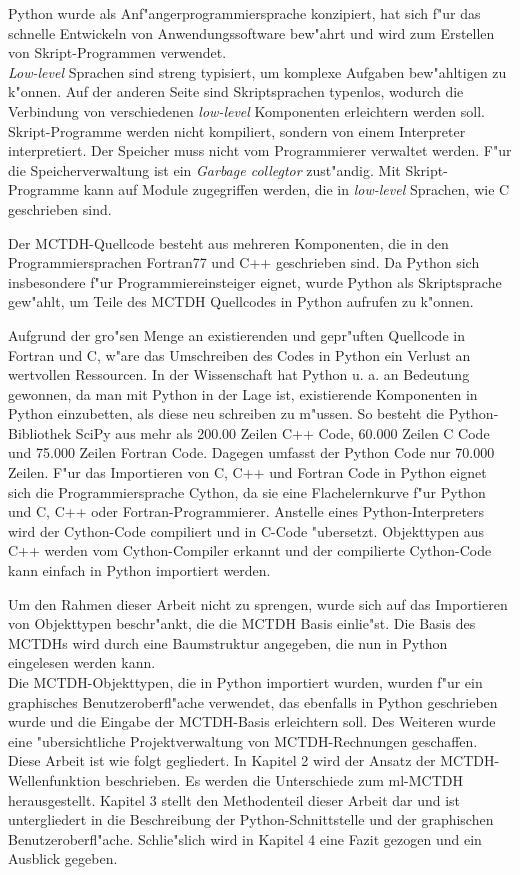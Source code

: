 Python wurde als Anf"angerprogrammiersprache konzipiert, hat sich f"ur das schnelle Entwickeln von Anwendungssoftware bew"ahrt und wird zum 
Erstellen von Skript-Program\-men verwendet. \cite{PyBook} 
\\\textit{Low-level} Sprachen sind streng typisiert, um komplexe Aufgaben bew"ahltigen zu k"onnen. 
Auf der anderen Seite sind Skriptsprachen typenlos, wodurch die Verbindung von verschiedenen \textit{low-level} Komponenten erleichtern werden soll. \cite{PyBook2} 
Skript-Programme werden nicht kompiliert, sondern von einem Interpreter interpretiert. 
Der Speicher muss nicht vom Programmierer verwaltet werden. F"ur die Speicherverwaltung ist ein
\textit{Garbage collegtor} zust"andig.
 Mit Skript-Programme kann auf Module zugegriffen werden, die in \textit{low-level} Sprachen,
 wie C geschrieben sind. \cite{PyKana}     
 
 Der MCTDH-Quellcode besteht aus mehreren Komponenten, die in den Programmiersprachen Fortran77 und C++ geschrieben sind.
 Da Python sich insbesondere f"ur Programmier\-einsteiger eignet, wurde Python als Skriptsprache gew"ahlt, um Teile des MCTDH Quellcodes in Python aufrufen
zu k"onnen.

Aufgrund der gro"sen Menge an existierenden und gepr"uften Quellcode in Fortran und C, w"are das Umschreiben des Codes in Python
ein Verlust an wertvollen Ressourcen. In der Wissenschaft hat Python u. a. an Bedeutung gewonnen, da man 
mit Python in der Lage ist, existierende Komponenten in Python einzubetten, als diese neu schreiben zu m"ussen.
So besteht die Python-Bibliothek SciPy aus mehr als 200.00 Zeilen C++ Code, 60.000 Zeilen C Code und 75.000 Zeilen Fortran Code.
Dagegen umfasst der Python Code nur 70.000 Zeilen. \cite{PyArt} 
F"ur das Importieren von C, C++ und Fortran Code in Python eignet sich die Programmiersprache Cython, da sie eine Flachelernkurve
f"ur Python und C, C++ oder Fortran-Programmierer.
Anstelle eines Python-Interpreters wird der Cython-Code compiliert und in C-Code "ubersetzt.
Objekttypen aus C++ werden vom Cython-Compiler erkannt und der compilierte Cython-Code kann
einfach in Python importiert werden. \cite{PyArt}  

 Um den Rahmen dieser Arbeit nicht zu sprengen, wurde sich auf das Importieren von Objekttypen beschr"ankt, 
die die MCTDH Basis einlie"st. Die Basis des MCTDHs wird durch eine Baumstruktur angegeben, die nun in Python eingelesen werden kann.
\\Die MCTDH-Objekttypen, die in Python importiert wurden, wurden f"ur ein graphisches Benutzeroberfl"ache verwendet, das ebenfalls in
Python geschrieben wurde und die Eingabe der MCTDH-Basis erleichtern soll. Des Weiteren wurde eine "ubersichtliche Projektverwaltung 
von MCTDH-Rechnungen geschaffen.  
\\Diese Arbeit ist wie folgt gegliedert. In Kapitel 2 wird der Ansatz der MCTDH-Wellenfunk\-tion beschrieben. Es werden die Unterschiede zum ml-MCTDH herausgestellt.
Kapitel 3 stellt den Methodenteil dieser Arbeit dar und ist untergliedert in die Beschreibung der Python-Schnittstelle und der graphischen Benutzeroberfl"ache.     
Schlie"slich wird in Kapitel 4 eine Fazit gezogen und ein Ausblick gegeben.     